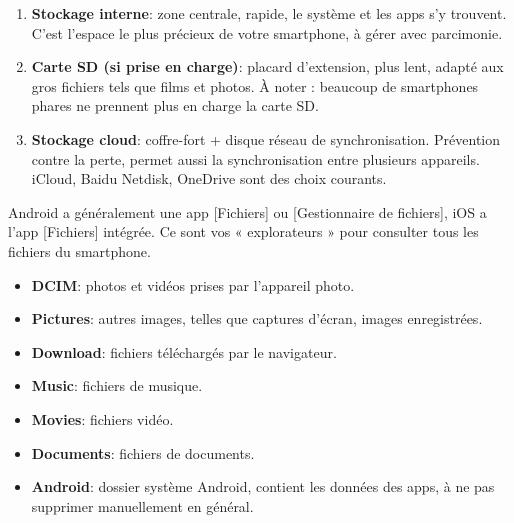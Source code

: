 


\begin{enumerate}
  \item \textbf{Stockage interne}: zone centrale, rapide, le système et les apps s'y trouvent. C'est l'espace le plus précieux de votre smartphone, à gérer avec parcimonie.
  \item \textbf{Carte SD (si prise en charge)}: placard d'extension, plus lent, adapté aux gros fichiers tels que films et photos. À noter : beaucoup de smartphones phares ne prennent plus en charge la carte SD.
  \item \textbf{Stockage cloud}: coffre-fort + disque réseau de synchronisation. Prévention contre la perte, permet aussi la synchronisation entre plusieurs appareils. iCloud, Baidu Netdisk, OneDrive sont des choix courants.
\end{enumerate}


Android a généralement une app [Fichiers] ou [Gestionnaire de fichiers], iOS a l'app [Fichiers] intégrée. Ce sont vos « explorateurs » pour consulter tous les fichiers du smartphone.


\begin{itemize}
  \item \textbf{DCIM}: photos et vidéos prises par l'appareil photo.
  \item \textbf{Pictures}: autres images, telles que captures d'écran, images enregistrées.
  \item \textbf{Download}: fichiers téléchargés par le navigateur.
  \item \textbf{Music}: fichiers de musique.
  \item \textbf{Movies}: fichiers vidéo.
  \item \textbf{Documents}: fichiers de documents.
  \item \textbf{Android}: dossier système Android, contient les données des apps, à ne pas supprimer manuellement en général.
\end{itemize}

